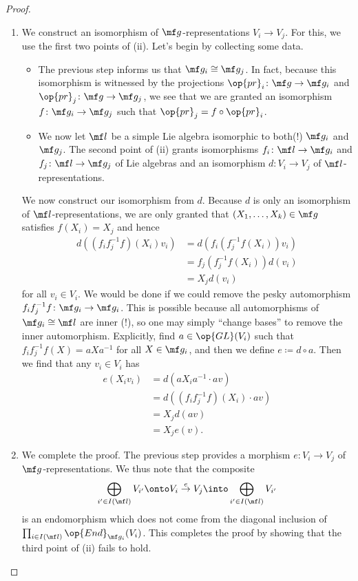 \documentclass[../thesis.tex]{subfiles}
\begin{document}
\begin{proof}
\begin{enumerate}
		\item We construct an isomorphism of $\mf g$-representations $V_i\to V_j$. For this, we use the first two points of (ii). Let's begin by collecting some data.
		\begin{itemize}
			\item The previous step informs us that $\mf g_i\cong\mf g_j$. In fact, because this isomorphism is witnessed by the projections $\op{pr}_i\colon\mf g\to\mf g_i$ and $\op{pr}_j\colon\mf g\to\mf g_j$, we see that we are granted an isomorphism $f\colon\mf g_i\to\mf g_j$ such that ${\op{pr}_j}=f\circ\op{pr}_i$.
			\item We now let $\mf l$ be a simple Lie algebra isomorphic to both(!) $\mf g_i$ and $\mf g_j$. The second point of (ii) grants isomorphisms $f_i\colon\mf l\to\mf g_i$ and $f_j\colon\mf l\to\mf g_j$ of Lie algebras and an isomorphism $d\colon V_i\to V_j$ of $\mf l$-representations.
		\end{itemize}
		We now construct our isomorphism from $d$. Because $d$ is only an isomorphism of $\mf l$-representations, we are only granted that $(X_1,\ldots,X_k)\in\mf g$ satisfies $f(X_i)=X_j$ and hence
		\begin{align*}
			d\left((f_if_j^{-1}f)(X_i) v_i\right) &= d\left(f_i\left(f_j^{-1}f(X_i)\right)v_i\right) \\
			&= f_j\left(f_j^{-1}f(X_i)\right)d(v_i) \\
			&= X_jd(v_i)
		\end{align*}
		for all $v_i\in V_i$. We would be done if we could remove the pesky automorphism $f_if_j^{-1}f\colon\mf g_i\to\mf g_i$. This is possible because all automorphisms of $\mf g_i\cong\mf l$ are inner (!), so one may simply ``change bases'' to remove the inner automorphism. Explicitly, find $a\in\op{GL}(V_i)$ such that $f_if_j^{-1}f(X)=aXa^{-1}$ for all $X\in\mf g_i$, and then we define $e\coloneqq d\circ a$. Then we find that any $v_i\in V_i$ has
		\begin{align*}
			e(X_iv_i) &= d\left(aX_ia^{-1}\cdot av\right) \\
			&= d\left((f_if_j^{-1}f)(X_i)\cdot av\right) \\
			&= X_jd(av) \\
			&= X_je(v).
		\end{align*}

		\item We complete the proof. The previous step provides a morphism $e\colon V_i\to V_j$ of $\mf g$-representations. We thus note that the composite
		\[\bigoplus_{i'\in I(\mf l)}V_{i'}\onto V_i\stackrel e\to V_j\into\bigoplus_{i'\in I(\mf l)}V_{i'}\]
		is an endomorphism which does not come from the diagonal inclusion of $\prod_{i\in I(\mf l)}\op{End}_{\mf g_i}(V_i)$. This completes the proof by showing that the third point of (ii) fails to hold.
		\qedhere
	\end{enumerate}
\end{proof}
\end{document}
